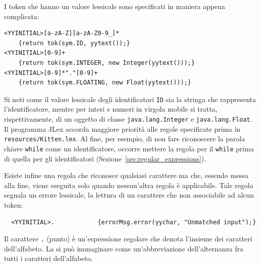 I token che hanno un valore lessicale sono specificati in maniera appena \piu
complicata:
%
\begin{verbatim}
<YYINITIAL>[a-zA-Z][a-zA-Z0-9_]*
    {return tok(sym.ID, yytext());}
<YYINITIAL>[0-9]+
    {return tok(sym.INTEGER, new Integer(yytext()));}
<YYINITIAL>[0-9]*"."[0-9]+
    {return tok(sym.FLOATING, new Float(yytext()));}
\end{verbatim}
%
Si noti come il valore lessicale degli identificatori \texttt{ID} sia
la stringa che rappresenta l'identificatore, mentre per interi e numeri
in virgola mobile si tratta, rispettivamente,
di un oggetto di classe \texttt{java.lang.Integer} e \texttt{java.lang.Float}.
Il programma JLex accorda maggiore priorit\`a alle regole
specificate prima in \texttt{resources/Kitten.lex}. Al fine, per esempio, di non
fare riconoscere la parola chiave \texttt{while} come un
identificatore, occorre mettere la regola per il \texttt{while}
prima di quella per gli identificatori (Sezione~\ref{sec:regular_expressions}).

Esiste infine una regola che riconosce qualsiasi carattere ma che, essendo
messa alla fine, viene eseguita solo quando nessun'altra regola
\`e applicabile. Tale regola segnala un errore lessicale, \cioe
la lettura di un carattere che non \e associabile ad alcun token:
%
\begin{verbatim}
  <YYINITIAL>.            {errorMsg.error(yychar, "Unmatched input");}
\end{verbatim}
%
Il carattere \texttt{.} (punto) \`e un'espressione regolare che denota
l'insieme dei caratteri dell'alfabeto. La si pu\`o immaginare come
un'abbreviazione dell'alternanza fra tutti i caratteri dell'alfabeto.
%
%

